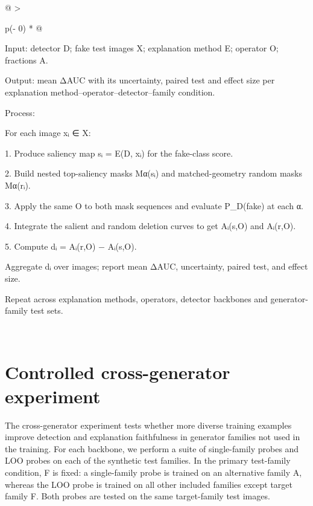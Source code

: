 \begin{longtable}[]{@{}
  >{\raggedright\arraybackslash}p{(\columnwidth - 0\tabcolsep) * }@{}}
\toprule\noalign{}
\begin{minipage}[b]{\linewidth}\raggedright
Input: detector D; fake test images X; explanation method E; operator O;
fractions A.

Output: mean ΔAUC with its uncertainty, paired test and effect size per
explanation method--operator--detector--family condition.

Process:

For each image xᵢ ∈ X:

1. Produce saliency map sᵢ = E(D, xᵢ) for the fake-class score.

2. Build nested top-saliency masks Mα(sᵢ) and matched-geometry random
masks Mα(rᵢ).

3. Apply the same O to both mask sequences and evaluate P\_D(fake) at
each α.

4. Integrate the salient and random deletion curves to get Aᵢ(s,O) and
Aᵢ(r,O).

5. Compute dᵢ = Aᵢ(r,O) − Aᵢ(s,O).

Aggregate dᵢ over images; report mean ΔAUC, uncertainty, paired test,
and effect size.

Repeat across explanation methods, operators, detector backbones and
generator-family test sets.
\end{minipage} \\
\midrule\noalign{}
\endhead
\bottomrule\noalign{}
\endlastfoot
\end{longtable}
\addtocounter{table}{-1} %

\section{\texorpdfstring{\textbf{Controlled cross-generator
experiment}}{Controlled cross-generator experiment}}\label{controlled-cross-generator-experiment}

The cross-generator experiment tests whether more diverse training
examples improve detection and explanation faithfulness in generator
families not used in the training. For each backbone, we perform a suite
of single-family probes and LOO probes on each of the synthetic test
families. In the primary test-family condition, F is fixed: a
single-family probe is trained on an alternative family A, whereas the
LOO probe is trained on all other included families except target family
F. Both probes are tested on the same target-family test images.

